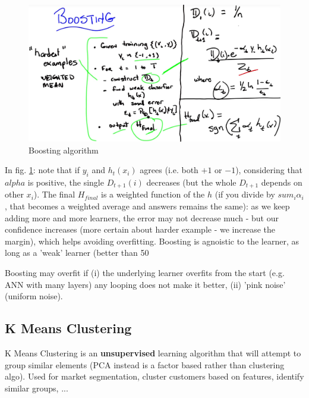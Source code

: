 \documentclass[11pt]{article}
\begin{document}
\begin{figure}[htbp] 
	\centering
	\includegraphics[width=.9\textwidth]{pics/boosting_1}
	\caption{Boosting algorithm} 
	\label{boosting_1}
\end{figure}
In fig. \ref{boosting_1}: note that if $y_i$ and $h_t(x_i)$ agrees (i.e. both $+1$ or $-1$), considering that $alpha$ is positive, the single $D_{t+1}(i)$ decreases (but the whole $D_{t+1}$ depends on other $x_i$). The final $H_{final}$ is a weighted function of the $h$ (if you divide by $sum_i \alpha_i$, that becomes a weighted average and answers remains the same): as we keep adding more and more learners, the error may not decrease much - but our confidence increases (more certain about harder example - we increase the margin), which helps avoiding overfitting. Boosting is agnoistic to the learner, as long as a 'weak' learner (better than 50%

Boosting may overfit if (i) the underlying learner overfits from the start (e.g. ANN with many layers) any looping does not make it better, (ii) 'pink noise' (uniform noise). 


\subsection{K Means Clustering}
K Means Clustering is an \textbf{unsupervised} learning algorithm that will attempt to group similar elements (PCA instead is a factor based rather than clustering algo). Used for market segmentation, cluster customers based on features, identify similar groups, ...
\end{document}
